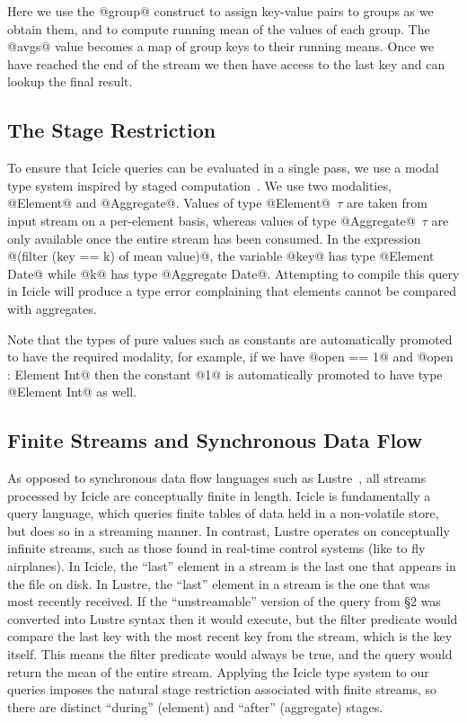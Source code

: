 Here we use the @group@ construct to assign key-value pairs to groups as we obtain them, and to compute running mean of the values of each group. The @avgs@ value becomes a map of group keys to their running means. Once we have reached the end of the stream we then have access to the last key and can lookup the final result.


\subsection{The Stage Restriction}
To ensure that Icicle queries can be evaluated in a single pass, we use a modal type system inspired by staged computation~\cite{davies2001modal}. We use two modalities, @Element@ and @Aggregate@. Values of type @Element@~$\tau$ are taken from input stream on a per-element basis, whereas values of type @Aggregate@~$\tau$ are only available once the entire stream has been consumed. In the expression @(filter (key == k) of mean value)@, the variable @key@ has type @Element Date@ while @k@ has type @Aggregate Date@. Attempting to compile this query in Icicle will produce a type error complaining that elements cannot be compared with aggregates.

Note that the types of pure values such as constants are automatically promoted to have the required modality, for example, if we have @open == 1@ and @open : Element Int@ then the constant @1@ is automatically promoted to have type @Element Int@ as well.


\subsection{Finite Streams and Synchronous Data Flow}
As opposed to synchronous data flow languages such as {\sc Lustre}~\cite{halbwachs1991synchronous}, all streams processed by Icicle are conceptually finite in length. Icicle is fundamentally a query language, which queries finite tables of data held in a non-volatile store, but does so in a streaming manner. In contrast, Lustre operates on conceptually infinite streams, such as those found in real-time control systems (like to fly airplanes). In Icicle, the ``last'' element in a stream is the last one that appears in the file on disk. In Lustre, the ``last'' element in a stream is the one that was most recently received. If the ``unstreamable'' version of the query from \S2 was converted into Lustre syntax then it would execute, but the filter predicate would compare the last key with the most recent key from the stream, which is the key itself. This means the filter predicate would always be true, and the query would return the mean of the entire stream. Applying the Icicle type system to our queries imposes the natural stage restriction associated with finite streams, so there are distinct ``during'' (element) and ``after'' (aggregate) stages.


